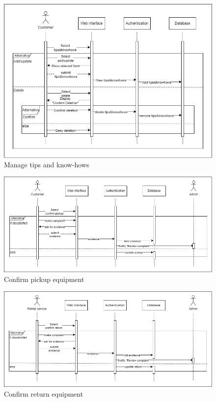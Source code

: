 \begin{figure}[h!]
    \centering
    \includegraphics[width=1\textwidth]{Images/Sequence Diagrams/Sequence diagrams-19-Manage tips & knowhows.drawio.png}
    \caption{Manage tips and know-hows}
\end{figure}

\begin{figure}[h!]
    \centering
    \includegraphics[width=1\textwidth]{Images/Sequence Diagrams/Sequence diagrams-20-Confirm pickup equipment.drawio.png}
    \caption{Confirm pickup equipment}
\end{figure}

\begin{figure}[h!]
    \centering
    \includegraphics[width=1\textwidth]{Images/Sequence Diagrams/Sequence diagrams-21-Confirm return equipment.drawio.png}
    \caption{Confirm return equipment}
\end{figure}

